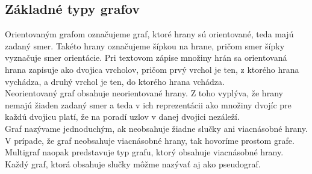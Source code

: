 \subsection{Základné typy grafov}

Orientovaným grafom označujeme graf, ktoré hrany sú orientované, teda majú zadaný smer. Takéto hrany označujeme šípkou na hrane, pričom smer šípky vyznačuje smer orientácie. Pri textovom zápise množiny hrán sa orientovaná hrana zapisuje ako dvojica vrcholov, pričom prvý vrchol je ten, z ktorého hrana vychádza, a druhý vrchol je ten, do ktorého hrana vchádza.\\

Neorientovaný graf obsahuje neorientované hrany. Z toho vyplýva, že hrany nemajú žiaden zadaný smer a teda v ich reprezentácii ako množiny dvojíc pre každú dvojicu platí, že na poradí uzlov v danej dvojici nezáleží.\\

Graf nazývame jednoduchým, ak neobsahuje žiadne slučky ani viacnásobné hrany. V prípade, že graf neobsahuje viacnásobné hrany, tak hovoríme prostom grafe. Multigraf naopak predstavuje typ grafu, ktorý obsahuje viacnásobné hrany. Každý graf, ktorá obsahuje slučky môžme nazývať aj ako pseudograf.
